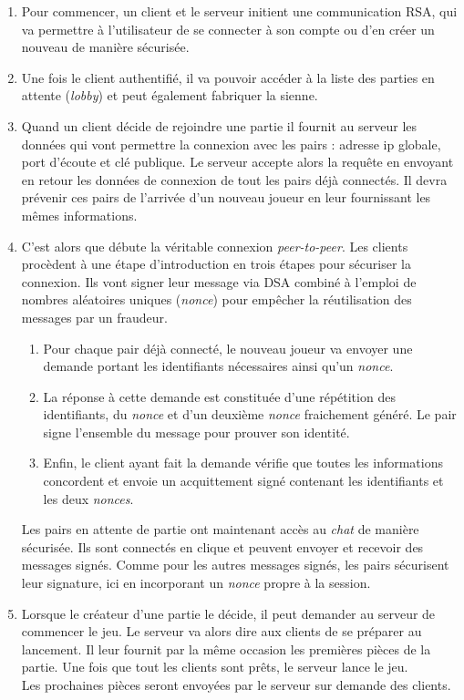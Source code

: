 \documentclass{article}
\begin{document}
\begin{enumerate}
\item
  Pour commencer, un client et le serveur initient une communication RSA,
  qui va permettre à l'utilisateur de se connecter à son compte ou d'en créer un nouveau de manière sécurisée.

\item
  Une fois le client authentifié, il va pouvoir accéder à la liste des parties en attente (\textit{lobby})
  et peut également fabriquer la sienne.

\item
  Quand un client décide de rejoindre une partie il fournit au serveur les données qui vont permettre la connexion avec les pairs :
  adresse ip globale, port d'écoute et clé publique.
  Le serveur accepte alors la requête en envoyant en retour les données de connexion de tout les pairs déjà connectés.
  Il devra prévenir ces pairs de l'arrivée d'un nouveau joueur en leur fournissant les mêmes informations.

\item
  C'est alors que débute la véritable connexion \textit{peer-to-peer}.
  Les clients procèdent à une étape d'introduction en trois étapes pour sécuriser la connexion.
  Ils vont signer leur message via DSA combiné à l'emploi de nombres aléatoires uniques (\textit{nonce}) pour empêcher la réutilisation des messages par un fraudeur.
  \begin{enumerate}
  \item
    Pour chaque pair déjà connecté, le nouveau joueur va envoyer une demande portant les identifiants nécessaires ainsi qu'un \textit{nonce}.
  \item
    La réponse à cette demande est constituée d'une répétition des identifiants, du \textit{nonce} et d'un deuxième \textit{nonce} fraichement généré.
    Le pair signe l'ensemble du message pour prouver son identité.
  \item
    Enfin, le client ayant fait la demande vérifie que toutes les informations concordent et envoie un acquittement signé contenant les identifiants et les deux \textit{nonces}.
  \end{enumerate}
  Les pairs en attente de partie ont maintenant accès au \textit{chat} de manière sécurisée.
  Ils sont connectés en clique et peuvent envoyer et recevoir des messages signés.
  Comme pour les autres messages signés, les pairs sécurisent leur signature, ici en incorporant un \textit{nonce} propre à la session.

\item
  Lorsque le créateur d'une partie le décide, il peut demander au serveur de commencer le jeu.
  Le serveur va alors dire aux clients de se préparer au lancement. Il leur fournit par la même occasion les premières pièces de la partie.
  Une fois que tout les clients sont prêts, le serveur lance le jeu. \\
  Les prochaines pièces seront envoyées par le serveur sur demande des clients.


\end{enumerate}
\end{document}

